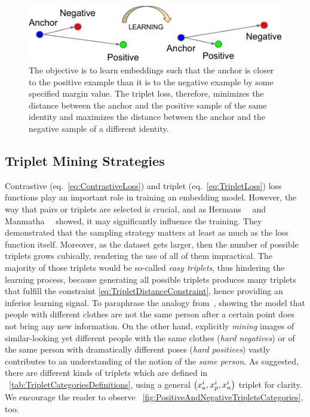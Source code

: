 \begin{figure}[t]
    \centerline{\includegraphics[width=0.6\linewidth]{figures/theoretical_foundations/triplet_loss_learning_process.pdf}}
    \caption[Triplet loss learning]{The objective is to learn embeddings such that the anchor is closer to the positive example than it is to the negative example by some specified margin value. The triplet loss, therefore, minimizes the distance between the anchor and the positive sample of the same identity and maximizes the distance between the anchor and the negative sample of a different identity. }
    \label{fig:TripletLossLearningProcess}
\end{figure}

\subsection{Triplet Mining Strategies}
\label{ssec:TripletMiningStrategies}

Contrastive (eq.~\ref{eq:ContrastiveLoss}) and triplet (eq.~\ref{eq:TripletLoss}) loss functions play an important role in training an embedding model. However, the way that pairs or triplets are selected is crucial, and as Hermans~\etal{}~\cite{hermans2017triplet} and Manmatha~\etal{}~\cite{manmatha2017samplingmatters} showed, it may significantly influence the training. They demonstrated that the sampling strategy matters at least as much as the loss function itself. Moreover, as the dataset gets larger, then the number of possible triplets grows cubically, rendering the use of all of them impractical. The majority of those triplets would be so-called \emph{easy triplets}, thus hindering the learning process, because generating all possible triplets produces many triplets that fulfill the constraint \ref{eq:TripletDistanceConstraint}, hence providing an inferior learning signal. To paraphrase the analogy from~\cite{hermans2017triplet}, showing the model that people with different clothes are not the same person after a certain point does not bring any new information. On the other hand, explicitly \emph{mining} images of similar-looking yet different people with the same clothes (\emph{hard negatives}) or of the same person with dramatically different poses (\emph{hard positives}) vastly contributes to an understanding of the notion of the \emph{same person}. As suggested, there are different kinds of triplets which are defined in \tabletext{}~\ref{tab:TripletCategoriesDefinitions}, using a general $\left( {x_a^i, x_p^i, x_n^i} \right)$ triplet for clarity. We encourage the reader to observe \figtext{}~\ref{fig:PositiveAndNegativeTripletsCategories}, too.


